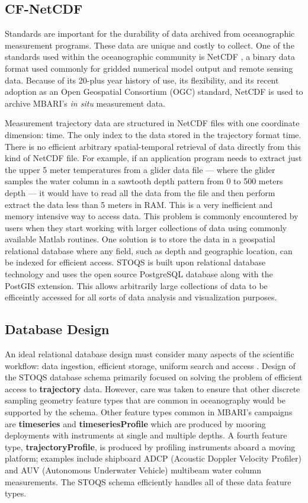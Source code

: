 \documentclass[conference]{IEEEtran}
\begin{document}
\subsection{CF-NetCDF}

Standards are important for the durability of data archived from oceanographic measurement programs. 
These data are unique and costly to collect. One of the standards used within 
the oceanographic community is NetCDF \cite{Rew1990}, a binary data format used 
commonly for gridded numerical model output and remote sensing data. Because of its 
20-plus year history of use, its flexibility, and its recent adoption as an 
Open Geospatial Consortium (OGC) standard, NetCDF is used to archive MBARI's 
\textit{in situ} measurement data.

Measurement trajectory data are
structured in NetCDF files with one coordinate dimension: time. 
The only index to the data stored in the trajectory format time. 
There is no efficient arbitrary spatial-temporal retrieval of 
data directly from this kind of NetCDF file. For example, 
if an application program needs to extract just the upper 5 meter temperatures from 
a glider data file --- where the glider samples the water column in a sawtooth 
depth pattern from 0 to 500 meters depth --- it would have to read all 
the data from the file and then perform extract the data less than 5 meters in RAM. 
This is a very 
inefficient and memory intensive way to access data. This problem is commonly
encountered by users when they start working with larger collections of data 
using commonly available Matlab routines. One solution is to store 
the data in a geospatial relational database where any field, such as depth 
and geographic location, can be indexed for efficient access.
STOQS is built 
upon relational database technology and uses the open source PostgreSQL 
database along with the PostGIS extension. This allows arbitrarily large collections
of data to be efficeintly accessed for all sorts of data analysis and visualization
purposes.

\subsection{Database Design}
An ideal relational database design must consider many aspects of the scientific 
workflow: data ingestion, efficient storage, uniform search and access 
\cite{Bechini:2013:MSS:2425433.2425647}. Design of the STOQS database schema primarily 
focused on solving the problem of efficient access to \textbf{trajectory} data. 
However, care was taken to ensure that other discrete sampling geometry feature types 
\cite{DSG} that are common in oceanography would be supported by the schema.  Other 
feature types common in MBARI's campaigns are \textbf{timeseries} and \textbf{timeseriesProfile} 
which are produced by mooring deployments with instruments at single and multiple depths. 
A fourth feature type, \textbf{trajectoryProfile}, is produced by profiling instruments 
aboard a moving platform; examples include shipboard ADCP (Acoustic Doppler Velocity Profiler)
and AUV (Autonomous Underwater Vehicle) multibeam water column 
measurements. The STOQS schema efficiently handles all of these data feature types.
\end{document}
